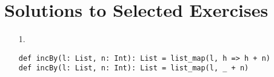 \setchapterpreamble[u]{\margintoc}
\chapter{Solutions to Selected Exercises}

\textbf{}

\begin{enumerate}
\item[1.]
\begin{verbatim}
def incBy(l: List, n: Int): List = list_map(l, h => h + n)
def incBy(l: List, n: Int): List = list_map(l, _ + n)
\end{verbatim}
\end{enumerate}

